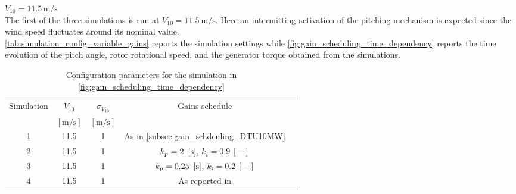 \textbf{$V_{10}=11.5 \, \si{\meter\per\second}$}\\
The first of the three simulations is run at $V_{10} = 11.5 \ \si{\meter\per\second}$. Here an intermitting activation of the pitching mechanism is expected since the wind speed fluctuates around its nominal value.\\
\autoref{tab:simulation_config_variable_gains} reports the simulation settings while \autoref{fig:gain_scheduling_time_dependency} reports the time evolution of the pitch angle, rotor rotational speed, and the generator torque obtained from the simulations. 

\begin{table}[htb]
  \caption{Configuration parameters for the simulation in \autoref{fig:gain_scheduling_time_dependency}}
  \centering
  \begin{tabular}{ccccc}
  \toprule
    Simulation & $V_{10}$  & $\sigma_{V_{10}}$ & Gains schedule \\ 
     & $\left[\si{\meter\per\second}\right]$ & $\left[\si{\meter\per\second}\right]$ & \\ \midrule       
     1 & 11.5 & 1 & As in \autoref{subsec:gain_schdeuling_DTU10MW}  \\
     2 & 11.5 & 1 & $k_p = 2 \ \mesunt{\second}$, $k_i=0.9 \ [-]$ \\
     3 & 11.5 & 1 & $k_p = 0.25 \ \mesunt{\second}$, $k_i=0.2 \ [-]$  \\
     4 & 11.5 & 1 & As reported in \cite{Olimpo_Anaya‐Lara}  \\
     \bottomrule
  \end{tabular}
  \label{tab:simulation_config_variable_gains}
\end{table}

